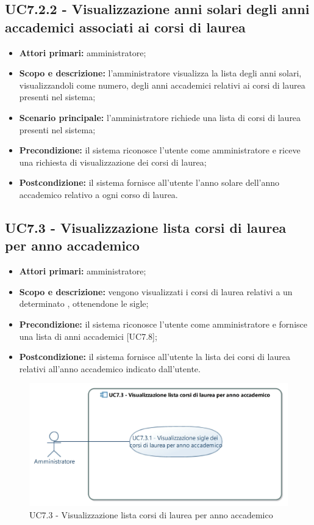 \documentclass[AnalisiDeiRequisiti.tex]{subfiles}
\begin{document}
\subsection{UC7.2.2 - Visualizzazione anni solari degli anni accademici associati ai corsi di laurea}
\begin{itemize}
	\item \textbf{Attori primari:} amministratore;
	\item \textbf{Scopo e descrizione:} l'amministratore visualizza la lista degli anni solari, visualizzandoli come numero, degli anni accademici relativi ai corsi di laurea presenti nel sistema;
	\item \textbf{Scenario principale:} l'amministratore richiede una lista di corsi di laurea presenti nel sistema;
	\item \textbf{Precondizione:} il sistema riconosce l'utente come amministratore e riceve una richiesta di visualizzazione dei corsi di laurea; 
	\item \textbf{Postcondizione:} il sistema fornisce all'utente l'anno solare dell'anno accademico relativo a ogni corso di laurea.
\end{itemize}
\subsection{UC7.3 - Visualizzazione lista corsi di laurea per anno accademico}
\begin{itemize}
	\item \textbf{Attori primari:} amministratore;
	\item \textbf{Scopo e descrizione:} vengono visualizzati i corsi di laurea relativi a un determinato , ottenendone le sigle;
	\item \textbf{Precondizione:} il sistema riconosce l'utente come amministratore e fornisce una lista di anni accademici [UC7.8];
	\item \textbf{Postcondizione:} il sistema fornisce all'utente la lista dei corsi di laurea relativi all'anno accademico indicato dall'utente.
\end{itemize}
\begin{figure}[H]
	\centering
	\includegraphics[width=0.7\linewidth]{UC7_3.jpg}
	\caption{UC7.3 - Visualizzazione lista corsi di laurea per anno accademico}
	\label{fig:UC7.3 - Visualizzazione lista corsi di laurea per anno accademico}
\end{figure}
\end{document}
